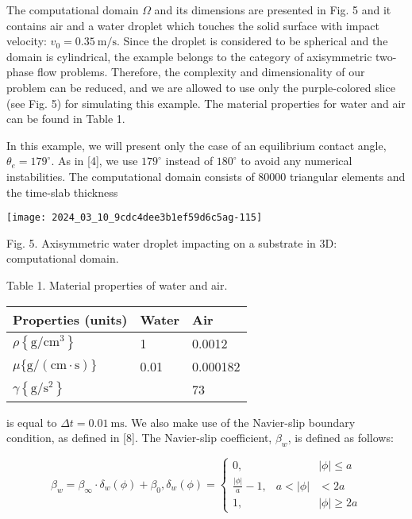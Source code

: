 \documentclass[10pt]{article}
\begin{document}
The computational domain $\Omega$ and its dimensions are presented in Fig. 5 and it contains air and a water droplet which touches the solid surface with impact velocity: $v_{0}=0.35 \mathrm{~m} / \mathrm{s}$. Since the droplet is considered to be spherical and the domain is cylindrical, the example belongs to the category of axisymmetric two-phase flow problems. Therefore, the complexity and dimensionality of our problem can be reduced, and we are allowed to use only the purple-colored slice (see Fig. 5) for simulating this example. The material properties for water and air can be found in Table 1.

In this example, we will present only the case of an equilibrium contact angle, $\theta_{e}=179^{\circ}$. As in [4], we use $179^{\circ}$ instead of $180^{\circ}$ to avoid any numerical instabilities. The computational domain consists of 80000 triangular elements and the time-slab thickness

\begin{center}
\texttt{[image: 2024\_03\_10\_9cdc4dee3b1ef59d6c5ag-115]}
\end{center}

Fig. 5. Axisymmetric water droplet impacting on a substrate in 3D: computational domain.

Table 1. Material properties of water and air.

\begin{center}
\begin{tabular}{l|l|l}
\hline
Properties (units) & Water & Air \\
\hline
$\rho\left\{\mathrm{g} / \mathrm{cm}^{3}\right\}$ & 1 & 0.0012 \\
\hline
$\mu\{\mathrm{g} /(\mathrm{cm} \cdot \mathrm{s})\}$ & 0.01 & 0.000182 \\
\hline
$\gamma\left\{\mathrm{g} / \mathrm{s}^{2}\right\}$ &  & 73 \\
\hline
\end{tabular}
\end{center}

is equal to $\Delta t=0.01 \mathrm{~ms}$. We also make use of the Navier-slip boundary condition, as defined in [8]. The Navier-slip coefficient, $\beta_{w}$, is defined as follows:

\[
\beta_{w}=\beta_{\infty} \cdot \delta_{w}(\phi)+\beta_{0}, \delta_{w}(\phi)=\left\{\begin{array}{crl}
0, & & |\phi| \leq a  \tag{3}\\
\frac{|\phi|}{a}-1, & a<|\phi| & <2 a \\
1, & & |\phi| \geq 2 a
\end{array}\right.
\]
\end{document}
